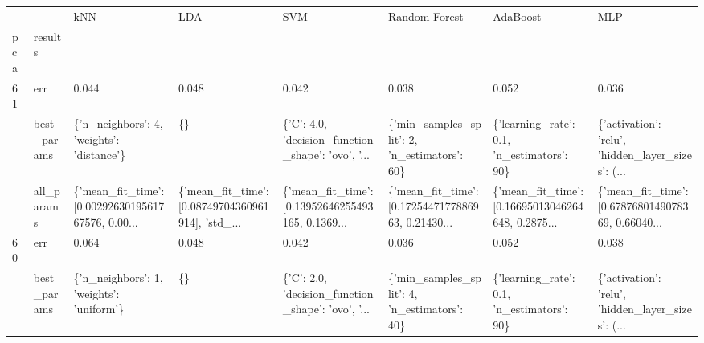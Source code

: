 \begin{tabular}{llllllll}
\toprule
   &            &                                                kNN &                                                LDA &                                                SVM &                                      Random Forest &                                           AdaBoost &                                                MLP \\
pca & results &                                                    &                                                    &                                                    &                                                    &                                                    &                                                    \\
\midrule
61 & err &                                              0.044 &                                              0.048 &                                              0.042 &                                              0.038 &                                              0.052 &                                              0.036 \\
   & best\_params &          \{'n\_neighbors': 4, 'weights': 'distance'\} &                                                 \{\} &  \{'C': 4.0, 'decision\_function\_shape': 'ovo', '... &       \{'min\_samples\_split': 2, 'n\_estimators': 60\} &         \{'learning\_rate': 0.1, 'n\_estimators': 90\} &  \{'activation': 'relu', 'hidden\_layer\_sizes': (... \\
   & all\_params &  \{'mean\_fit\_time': [0.0029263019561767576, 0.00... &  \{'mean\_fit\_time': [0.08749704360961914], 'std\_... &  \{'mean\_fit\_time': [0.13952646255493165, 0.1369... &  \{'mean\_fit\_time': [0.1725447177886963, 0.21430... &  \{'mean\_fit\_time': [0.16695013046264648, 0.2875... &  \{'mean\_fit\_time': [0.6787680149078369, 0.66040... \\
60 & err &                                              0.064 &                                              0.048 &                                              0.042 &                                              0.036 &                                              0.052 &                                              0.038 \\
   & best\_params &           \{'n\_neighbors': 1, 'weights': 'uniform'\} &                                                 \{\} &  \{'C': 2.0, 'decision\_function\_shape': 'ovo', '... &       \{'min\_samples\_split': 4, 'n\_estimators': 40\} &         \{'learning\_rate': 0.1, 'n\_estimators': 90\} &  \{'activation': 'relu', 'hidden\_layer\_sizes': (... \\

\end{tabular}
